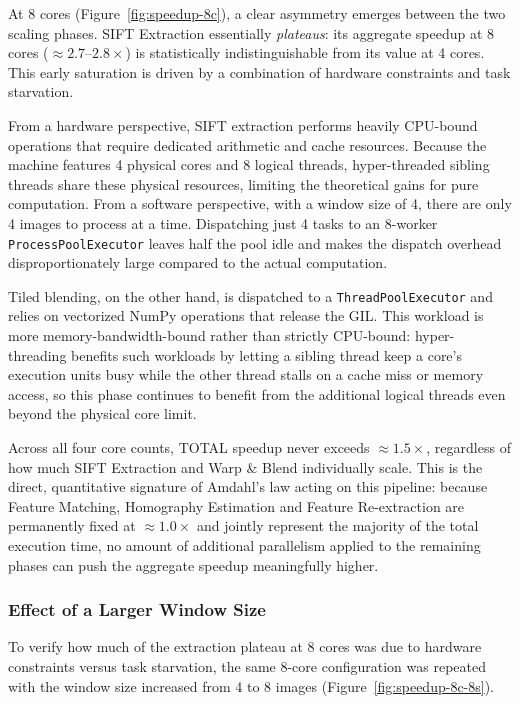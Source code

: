 \documentclass[10pt,twocolumn,letterpaper]{article}
\begin{document}
At 8 cores (Figure~\ref{fig:speedup-8c}), a clear asymmetry emerges between the two scaling
phases. SIFT Extraction essentially \emph{plateaus}: its aggregate speedup at 8 cores
($\approx 2.7$--$2.8\times$) is statistically indistinguishable from its value at 4 cores. This
early saturation is driven by a combination of hardware constraints and task starvation.

From a hardware perspective, SIFT extraction performs heavily CPU-bound operations that require
dedicated arithmetic and cache resources. Because the machine features 4 physical cores and 8
logical threads, hyper-threaded sibling threads share these physical resources, limiting the
theoretical gains for pure computation. From a software perspective, with a window size of 4,
there are only 4 images to process at a time. Dispatching just 4 tasks to an 8-worker
\texttt{ProcessPoolExecutor} leaves half the pool idle and makes the dispatch overhead
disproportionately large compared to the actual computation.

Tiled blending, on the other hand, is dispatched to a \texttt{ThreadPoolExecutor} and relies on
vectorized NumPy operations that release the GIL. This workload is more memory-bandwidth-bound
rather than strictly CPU-bound: hyper-threading benefits such workloads by letting a sibling
thread keep a core's execution units busy while the other thread stalls on a cache miss or
memory access, so this phase continues to benefit from the additional logical threads even
beyond the physical core limit.

Across all four core counts, TOTAL speedup never exceeds $\approx 1.5\times$, regardless of how
much SIFT Extraction and Warp \& Blend individually scale. This is the direct, quantitative
signature of Amdahl's law acting on this pipeline: because Feature Matching, Homography
Estimation and Feature Re-extraction are permanently fixed at $\approx 1.0\times$ and jointly
represent the majority of the total execution time, no amount of additional parallelism applied
to the remaining phases can push the aggregate speedup meaningfully higher.

\subsubsection{Effect of a Larger Window Size}

To verify how much of the extraction plateau at 8 cores was due to hardware constraints versus
task starvation, the same 8-core configuration was repeated with the window size increased from
4 to 8 images (Figure~\ref{fig:speedup-8c-8s}).
\end{document}
